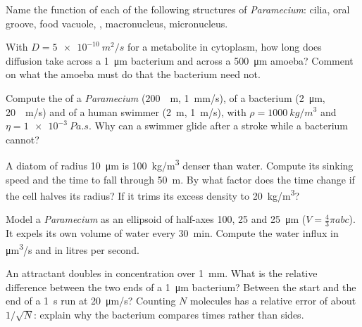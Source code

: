\begin{exercise}[$\star$]\label{exo:b2:unicellular-diversity:4}
Name the function of each of the following structures of
\emph{Paramecium}: cilia, oral groove, food vacuole, , macronucleus, micronucleus.
\end{exercise}

\begin{exercise}[$\star\star$]\label{exo:b2:unicellular-diversity:5}
With $D = \qty{5e-10}{m^2/s}$ for a metabolite in cytoplasm, how long
does diffusion take across a \qty{1}{\micro m} bacterium and across a
\qty{500}{\micro m} amoeba? Comment on what the amoeba must do that
the bacterium need not.
\end{exercise}

\begin{exercise}[$\star\star$]\label{exo:b2:unicellular-diversity:6}
Compute the  of a \emph{Paramecium} (\qty{200}{\micro
m}, \qty{1}{mm/s}), of a bacterium (\qty{2}{\micro m}, \qty{20}{\micro
m/s}) and of a human swimmer (\qty{2}{m}, \qty{1}{m/s}), with
$\rho = \qty{1000}{kg/m^3}$ and $\eta = \qty{1e-3}{Pa.s}$. Why can a
swimmer glide after a stroke while a bacterium cannot?
\end{exercise}

\begin{exercise}[$\star\star$]\label{exo:b2:unicellular-diversity:7}
A diatom of radius \qty{10}{\micro m} is \qty{100}{kg/m^3} denser
than water. Compute its sinking speed and the time to fall through
\qty{50}{m}. By what factor does the time change if the cell halves
its radius? If it trims its excess density to \qty{20}{kg/m^3}?
\end{exercise}

\begin{exercise}[$\star\star$]\label{exo:b2:unicellular-diversity:8}
Model a \emph{Paramecium} as an ellipsoid of half-axes \num{100},
\num{25} and \qty{25}{\micro m} ($V = \tfrac{4}{3}\pi abc$). It
expels its own volume of water every \qty{30}{min}. Compute the
water influx in \unit{\micro m^3/s} and in litres per second.
\end{exercise}

\begin{exercise}[$\star\star$]\label{exo:b2:unicellular-diversity:9}
An attractant doubles in concentration over \qty{1}{mm}. What is the
relative difference between the two ends of a \qty{1}{\micro m}
bacterium? Between the start and the end of a \qty{1}{s} run at
\qty{20}{\micro m/s}? Counting $N$ molecules has a relative error of
about $1/\sqrt{N}$: explain why the bacterium compares times rather
than sides.
\end{exercise}

